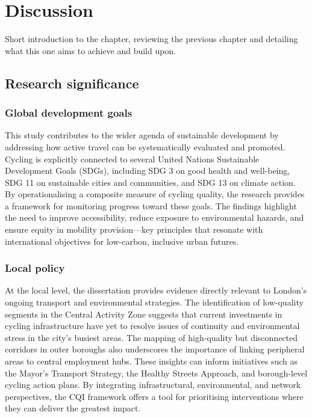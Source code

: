 \documentclass[
  12pt,
  oneside]{book}
\begin{document}
\chapter{Discussion}\label{discussion}

Short introduction to the chapter, reviewing the previous chapter and detailing what this one aims to achieve and build upon.

\section{Research significance}\label{research-significance}

\subsection{Global development goals}\label{global-development-goals}

This study contributes to the wider agenda of sustainable development by addressing how active travel can be systematically evaluated and promoted. Cycling is explicitly connected to several United Nations Sustainable Development Goals (SDGs), including SDG 3 on good health and well-being, SDG 11 on sustainable cities and communities, and SDG 13 on climate action. By operationalising a composite measure of cycling quality, the research provides a framework for monitoring progress toward these goals. The findings highlight the need to improve accessibility, reduce exposure to environmental hazards, and ensure equity in mobility provision---key principles that resonate with international objectives for low-carbon, inclusive urban futures.

\subsection{Local policy}\label{local-policy}

At the local level, the dissertation provides evidence directly relevant to London's ongoing transport and environmental strategies. The identification of low-quality segments in the Central Activity Zone suggests that current investments in cycling infrastructure have yet to resolve issues of continuity and environmental stress in the city's busiest areas. The mapping of high-quality but disconnected corridors in outer boroughs also underscores the importance of linking peripheral areas to central employment hubs. These insights can inform initiatives such as the Mayor's Transport Strategy, the Healthy Streets Approach, and borough-level cycling action plans. By integrating infrastructural, environmental, and network perspectives, the CQI framework offers a tool for prioritising interventions where they can deliver the greatest impact.
\end{document}
